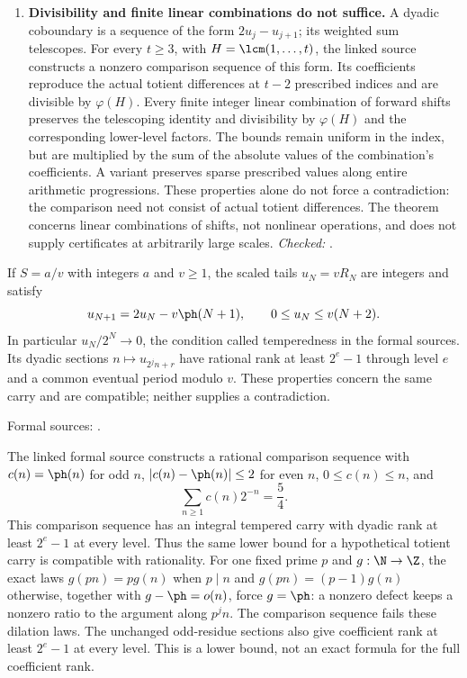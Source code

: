 \documentclass[11pt]{article}
\begin{document}
\begin{enumerate}
\item\label{res:factorideal}
\textbf{Divisibility and finite linear combinations do not suffice.}
A dyadic coboundary is a sequence of the form $2u_j-u_{j+1}$; its weighted
sum telescopes. For every $t\ge3$, with $H=\lcm(1,\ldots,t)$, the linked
source constructs a nonzero comparison sequence of this form. Its
coefficients reproduce the actual totient differences at $t-2$
prescribed indices and are divisible by $\varphi(H)$. Every finite integer
linear combination of forward shifts preserves the telescoping identity and
divisibility by $\varphi(H)$ and the corresponding lower-level factors.
The bounds remain uniform in the index, but are multiplied by the sum
of the absolute values of the combination's coefficients.
A variant preserves sparse prescribed values along entire arithmetic
progressions. These properties alone do not force a contradiction: the
comparison need not consist of actual totient differences. The theorem
concerns linear combinations of shifts, not nonlinear operations, and
does not supply certificates at arbitrarily large scales.
{\footnotesize\emph{Checked:}
.}
\end{enumerate}

If $S=a/v$ with integers $a$ and $v\ge1$, the scaled tails $u_N=vR_N$
are integers and satisfy
\[
 u_{N+1}=2u_N-v\ph(N+1),\qquad 0\le u_N\le v(N+2).
\]
In particular $u_N/2^N\to0$, the condition called temperedness in the
formal sources. Its dyadic sections $n\mapsto u_{2^jn+r}$ have rational rank at
least $2^e-1$ through level $e$ and a common eventual period modulo $v$.
These properties concern the same carry and are compatible; neither
supplies a contradiction.

\noindent Formal sources: .

The linked formal source constructs a rational comparison sequence with
$c(n)=\ph(n)$ for odd $n$, $|c(n)-\ph(n)|\le2$ for even $n$, $0\le c(n)\le n$,
and
\[
 \sum_{n\ge1}c(n)2^{-n}=\frac54.
\]
This comparison sequence has an integral tempered carry with dyadic rank
at least $2^e-1$ at every level. Thus the same lower bound for a hypothetical totient carry is
compatible with rationality. For one fixed prime $p$ and $g:\N\to\Z$, the exact laws
$g(pn)=p g(n)$ when $p\mid n$ and $g(pn)=(p-1)g(n)$ otherwise, together
with $g-\ph=o(n)$, force $g=\ph$: a nonzero defect keeps a nonzero ratio
to the argument along $p^j n$. The comparison sequence fails these dilation laws. The unchanged odd-residue sections
also give coefficient rank at least $2^e-1$ at every level. This is a
lower bound, not an exact formula for the full coefficient rank.
\end{document}
